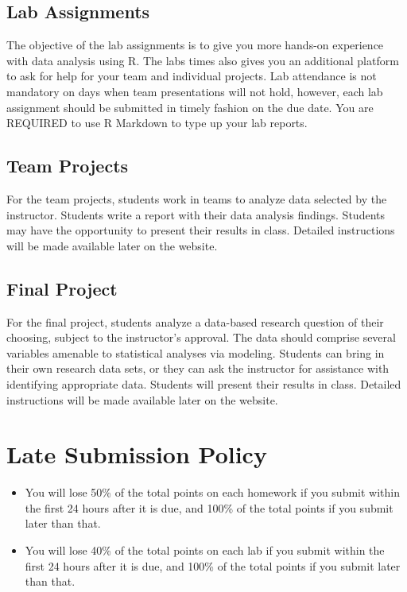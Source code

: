 \documentclass[11pt, a4paper]{article}
\begin{document}
\subsection{Lab Assignments}
The objective of the lab assignments is to give you more hands-on experience with data analysis using R. The labs times also gives you an additional platform to ask for help for your team and individual projects. Lab attendance is not mandatory on days when team presentations will not hold, however, each lab assignment should be submitted in timely fashion on the due date. You are REQUIRED to use R Markdown to type up your lab reports.

\subsection{Team Projects}
For the team projects, students work in teams to analyze data selected by the instructor. Students write a report with their data analysis findings. Students may have the opportunity to present their results in class. Detailed instructions will be made available later on the website.

\subsection{Final Project}
For the final project, students analyze a data-based research question of their choosing, subject to the instructor's approval. The data should comprise several variables amenable to statistical analyses via modeling. Students can bring in their own research data sets, or they can ask the instructor for assistance with identifying appropriate data. Students will present their results in class. Detailed instructions will be made available later on the website.


\section{Late Submission Policy} 
\begin{itemize}
	\item  You will lose 50\% of the total points on each homework if you submit within the first 24 hours after it is due, and 100\% of the total points if you submit later than that.
	\item You will lose 40\% of the total points on each lab if you submit within the first 24 hours after it is due, and 100\% of the total points if you submit later than that.
\end{itemize}
\end{document}
